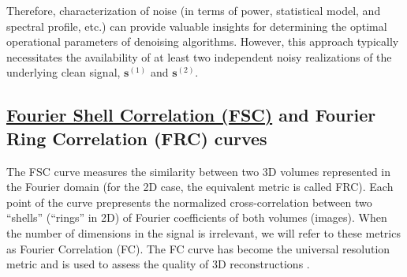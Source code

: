 \documentclass{article}
\begin{document}
Therefore, characterization of noise (in terms of power, statistical
model, and spectral profile, etc.) can provide valuable insights for
determining the optimal operational parameters of denoising
algorithms. However, this approach typically necessitates the
availability of at least two independent noisy realizations of the
underlying clean signal, $\mathbf{s}^{(1)}$ and
$\mathbf{s}^{(2)}$.

\subsection{\href{https://en.wikipedia.org/wiki/Fourier_shell_correlation}{Fourier
    Shell Correlation (FSC)} and Fourier Ring Correlation (FRC)
  curves}
\label{sec:fourier_correlation}

The FSC curve measures the similarity between two 3D volumes
represented in the Fourier domain \cite{verbeke2024self} (for the 2D
case, the equivalent metric is called FRC). Each point of the curve
prepresents the normalized cross-correlation between two ``shells''
(``rings'' in 2D) of Fourier coefficients of both volumes
(images). When the number of dimensions in the signal is irrelevant,
we will refer to these metrics as Fourier Correlation (FC). The FC
curve has become the universal resolution metric and is used to assess
the quality of 3D reconstructions
\cite{rosenthal2003optimal,scheres2012prevention}.
\end{document}
